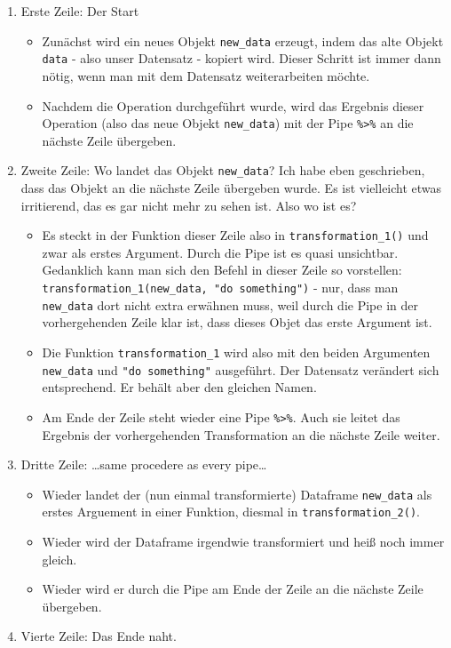 \documentclass[
]{book}
\begin{document}
\begin{enumerate}
\def\labelenumi{\arabic{enumi}.}
\item
  Erste Zeile: Der Start

  \begin{itemize}
  \item
    Zunächst wird ein neues Objekt \texttt{new\_data} erzeugt, indem das alte Objekt \texttt{data} - also unser Datensatz - kopiert wird. Dieser Schritt ist immer dann nötig, wenn man mit dem Datensatz weiterarbeiten möchte.
  \item
    Nachdem die Operation durchgeführt wurde, wird das Ergebnis dieser Operation (also das neue Objekt \texttt{new\_data}) mit der Pipe \texttt{\%\textgreater{}\%} an die nächste Zeile übergeben.
  \end{itemize}
\item
  Zweite Zeile: Wo landet das Objekt \texttt{new\_data}? Ich habe eben geschrieben, dass das Objekt an die nächste Zeile übergeben wurde. Es ist vielleicht etwas irritierend, das es gar nicht mehr zu sehen ist. Also wo ist es?

  \begin{itemize}
  \item
    Es steckt in der Funktion dieser Zeile also in \texttt{transformation\_1()} und zwar als erstes Argument. Durch die Pipe ist es quasi unsichtbar. Gedanklich kann man sich den Befehl in dieser Zeile so vorstellen: \texttt{transformation\_1(new\_data,\ "do\ something")} - nur, dass man \texttt{new\_data} dort nicht extra erwähnen muss, weil durch die Pipe in der vorhergehenden Zeile klar ist, dass dieses Objet das erste Argument ist.
  \item
    Die Funktion \texttt{transformation\_1} wird also mit den beiden Argumenten \texttt{new\_data} und \texttt{"do\ something"} ausgeführt. Der Datensatz verändert sich entsprechend. Er behält aber den gleichen Namen.
  \item
    Am Ende der Zeile steht wieder eine Pipe \texttt{\%\textgreater{}\%}. Auch sie leitet das Ergebnis der vorhergehenden Transformation an die nächste Zeile weiter.
  \end{itemize}
\item
  Dritte Zeile: \ldots same procedere as every pipe\ldots{}

  \begin{itemize}
  \item
    Wieder landet der (nun einmal transformierte) Dataframe \texttt{new\_data} als erstes Arguement in einer Funktion, diesmal in \texttt{transformation\_2()}.
  \item
    Wieder wird der Dataframe irgendwie transformiert und heiß noch immer gleich.
  \item
    Wieder wird er durch die Pipe am Ende der Zeile an die nächste Zeile übergeben.
  \end{itemize}
\item
  Vierte Zeile: Das Ende naht.


\end{enumerate}
\end{document}
